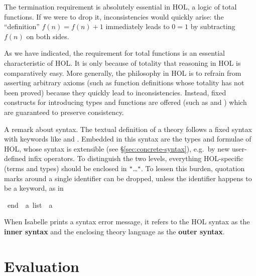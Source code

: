 \begin{isabellebody}
\begin{isamarkuptext}
The termination requirement is absolutely essential in HOL, a logic of total
functions. If we were to drop it, inconsistencies would quickly arise: the
``definition'' $f(n) = f(n)+1$ immediately leads to $0 = 1$ by subtracting
$f(n)$ on both sides.

\begin{warn}
  As we have indicated, the requirement for total functions is an essential characteristic of HOL\@. It is only
  because of totality that reasoning in HOL is comparatively easy.  More
  generally, the philosophy in HOL is to refrain from asserting arbitrary axioms (such as
  function definitions whose totality has not been proved) because they
  quickly lead to inconsistencies. Instead, fixed constructs for introducing
  types and functions are offered (such as  and
  ) which are guaranteed to preserve consistency.
\end{warn}

%
A remark about syntax.  The textual definition of a theory follows a fixed
syntax with keywords like  and .
Embedded in this syntax are the types and formulae of HOL, whose syntax is
extensible (see \S\ref{sec:concrete-syntax}), e.g.\ by new user-defined infix operators.
To distinguish the two levels, everything
HOL-specific (terms and types) should be enclosed in
\texttt{"}\dots\texttt{"}. 
To lessen this burden, quotation marks around a single identifier can be
dropped, unless the identifier happens to be a keyword, as in%
\end{isamarkuptext}%
\isamarkuptrue%
\isamarkupfalse%
\ {\isachardoublequoteopen}end{\isachardoublequoteclose}\ {\isacharcolon}{\isacharcolon}\ {\isachardoublequoteopen}{\isacharprime}a\ list\ {\isasymRightarrow}\ {\isacharprime}a{\isachardoublequoteclose}%
\begin{isamarkuptext}%
\noindent
When Isabelle prints a syntax error message, it refers to the HOL syntax as
the \textbf{inner syntax} and the enclosing theory language as the \textbf{outer syntax}.

\section{Evaluation}


\end{isamarkuptext}
\end{isabellebody}
